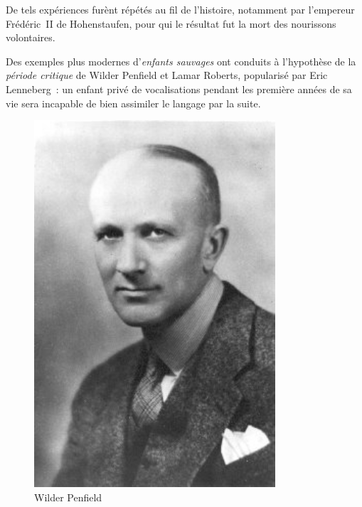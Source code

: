 \begin{minipage}[H]{0.65\linewidth}
De tels expériences furènt répétés au fil de l'histoire, notamment par l'empereur Frédéric~II de Hohenstaufen, pour qui le résultat fut la mort des nourissons volontaires\cite{ggcoulton-francis-to-dante}. 

Des exemples plus modernes d'\emph{enfants sauvages} ont conduits à l'hypothèse de la \emph{période critique} de Wilder Penfield et Lamar Roberts\cite{penfield2003speech}, popularisé par Eric Lenneberg\cite{lenneberg-crit-period}~: un enfant privé de vocalisations pendant les première années de sa vie sera incapable de bien assimiler le langage par la suite.
\vspace{1cm}
\end{minipage}
\begin{minipage}[H]{0.34\linewidth}
  \begin{figure}[H]
  \centering
  \includegraphics[width=0.8\textwidth]{../resources/illustrations/penfield}
  \caption{Wilder Penfield}
  \end{figure}
\end{minipage}

